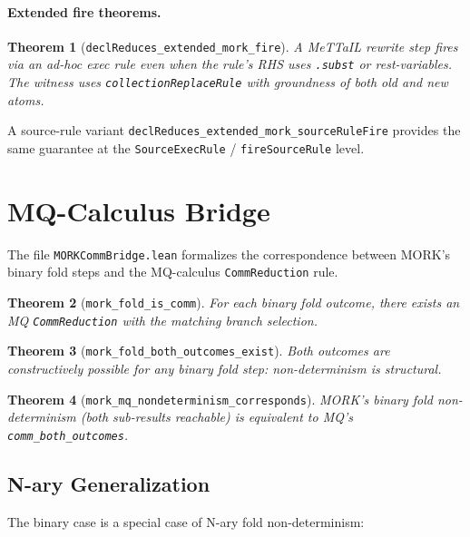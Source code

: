 \documentclass[11pt]{article}
\newtheorem{theorem}{Theorem}[section]
\theoremstyle{definition}
\theoremstyle{remark}
\newcommand{\MORK}{\textup{MORK}}
\newcommand{\MeTTaIL}{\textup{MeTTaIL}}
\begin{document}
\paragraph{Extended fire theorems.}
\begin{theorem}[\texttt{declReduces\_extended\_mork\_fire}]
A \MeTTaIL{} rewrite step fires via an ad-hoc exec rule even when
the rule's RHS uses \texttt{.subst} or rest-variables.  The witness
uses \texttt{collectionReplaceRule} with groundness of both old and
new atoms.
\end{theorem}

\noindent
A source-rule variant \texttt{declReduces\_extended\_mork\_sourceRuleFire}
provides the same guarantee at the \texttt{SourceExecRule} /
\texttt{fireSourceRule} level.

\section{MQ-Calculus Bridge}
\label{sec:mqbridge}

The file \texttt{MORKCommBridge.lean} formalizes the correspondence between
\MORK{}'s binary fold steps and the MQ-calculus \texttt{CommReduction} rule.

\begin{theorem}[\texttt{mork\_fold\_is\_comm}]
For each binary fold outcome, there exists an MQ \texttt{CommReduction} with
the matching branch selection.
\end{theorem}

\begin{theorem}[\texttt{mork\_fold\_both\_outcomes\_exist}]
Both outcomes are constructively possible for any binary fold step:
non-determinism is structural.
\end{theorem}

\begin{theorem}[\texttt{mork\_mq\_nondeterminism\_corresponds}]
\MORK{}'s binary fold non-determinism (both sub-results reachable) is
equivalent to MQ's \texttt{comm\_both\_outcomes}.
\end{theorem}

\subsection{N-ary Generalization}

The binary case is a special case of N-ary fold non-determinism:
\end{document}
